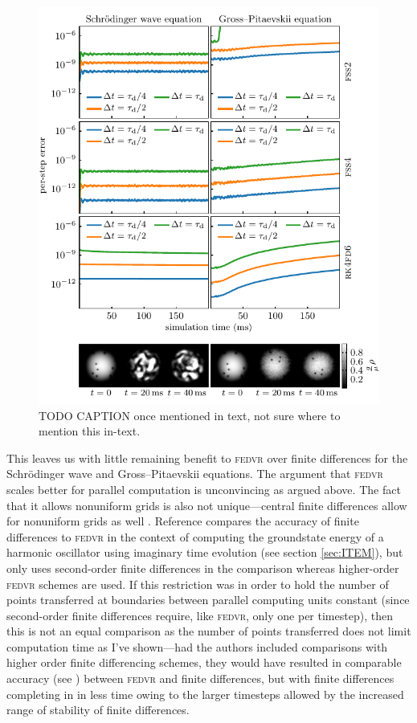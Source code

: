 \begin{figure}[t]
    \centerfloat
    \includegraphics{figures/numerics/stability.pdf}
    \caption{TODO CAPTION once mentioned in text, not sure where to mention this in-text.}
    \label{fig:stability}
\end{figure}

This leaves us with little remaining benefit to \textsc{fedvr} over finite differences for the Schr\"odinger wave and Gross--Pitaevskii equations. The argument that \textsc{fedvr} scales better for parallel computation is unconvincing as argued above. The fact that it allows nonuniform grids is also not unique---central finite differences allow for nonuniform grids as well \cite{fornberg_generation_1988}. Reference \cite{schneider_parallel_2006} compares the accuracy of finite differences to \textsc{fedvr} in the context of computing the groundstate energy of a harmonic oscillator using imaginary time evolution (see section \ref{sec:ITEM}), but only uses second-order finite differences in the comparison whereas higher-order \textsc{fedvr} schemes are used. If this restriction was in order to hold the number of points transferred at boundaries between parallel computing units constant (since second-order finite differences require, like \textsc{fedvr}, only one per timestep), then this is not an equal comparison as the number of points transferred does not limit computation time as I've shown---had the authors included comparisons with higher order finite differencing schemes, they would have resulted in comparable accuracy (see ) between \textsc{fedvr} and finite differences, but with finite differences completing in in less time owing to the larger timesteps allowed by the increased range of stability of finite differences.

